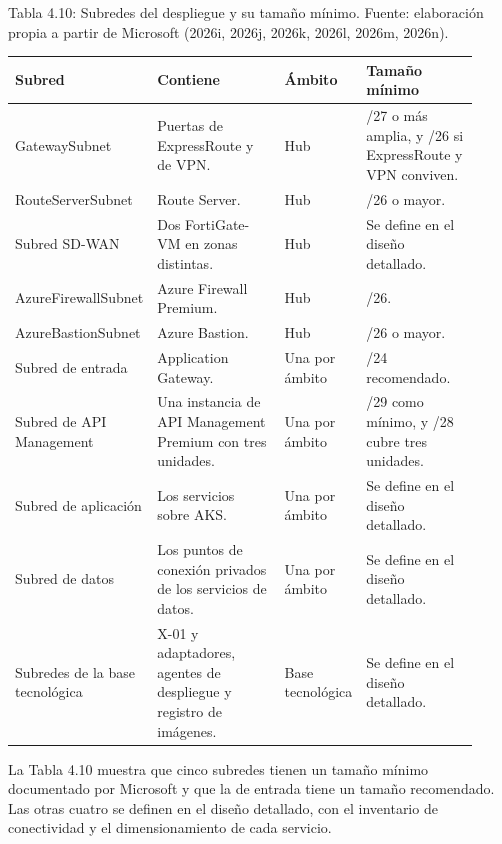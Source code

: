 \documentclass[11pt]{article}
\begin{document}
Tabla 4.10: Subredes del despliegue y su tamaño mínimo. Fuente: elaboración propia a partir de Microsoft (2026i, 2026j, 2026k, 2026l, 2026m, 2026n).\par\nopagebreak
\begin{longtable}{@{}p{0.216\linewidth}p{0.295\linewidth}p{0.157\linewidth}p{0.256\linewidth}@{}}
\toprule Subred & Contiene & Ámbito & Tamaño mínimo \\
\midrule\endhead\bottomrule\endlastfoot
GatewaySubnet & Puertas de ExpressRoute y de VPN. & Hub & /27 o más amplia, y /26 si ExpressRoute y VPN conviven. \\
RouteServerSubnet & Route Server. & Hub & /26 o mayor. \\
Subred SD-WAN & Dos FortiGate-VM en zonas distintas. & Hub & Se define en el diseño detallado. \\
AzureFirewallSubnet & Azure Firewall Premium. & Hub & /26. \\
AzureBastionSubnet & Azure Bastion. & Hub & /26 o mayor. \\
Subred de entrada & Application Gateway. & Una por ámbito & /24 recomendado. \\
Subred de API Management & Una instancia de API Management Premium con tres unidades. & Una por ámbito & /29 como mínimo, y /28 cubre tres unidades. \\
Subred de aplicación & Los servicios sobre AKS. & Una por ámbito & Se define en el diseño detallado. \\
Subred de datos & Los puntos de conexión privados de los servicios de datos. & Una por ámbito & Se define en el diseño detallado. \\
Subredes de la base tecnológica & X-01 y adaptadores, agentes de despliegue y registro de imágenes. & Base tecnológica & Se define en el diseño detallado. \\
\end{longtable}

La Tabla 4.10 muestra que cinco subredes tienen un tamaño mínimo documentado por Microsoft y que la de entrada tiene un tamaño recomendado. Las otras cuatro se definen en el diseño detallado, con el inventario de conectividad y el dimensionamiento de cada servicio.
\end{document}
